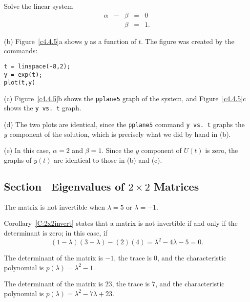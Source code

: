 \soln Solve the linear system
\[
\begin{array}{rrrrl}
\alpha & - & \beta & = & 0 \\
& & \beta & = & 1. \end{array}
\]

(b) Figure~\ref{c4.4.5}a shows $y$ as a function of $t$.  The figure
was created by the \Matlab commands:
\begin{verbatim}
t = linspace(-8,2);
y = exp(t);
plot(t,y)
\end{verbatim}

(c) Figure~\ref{c4.4.5}b shows the {\tt pplane5} graph of the system,
and Figure~\ref{c4.4.5}c shows the {\tt y vs.\ t} graph.

(d) The two plots are identical, since the {\tt pplane5} command
{\tt y vs.\ t} graphs the $y$ component of the solution, which is
precisely what we did by hand in (b).

(e) In this case, $\alpha = 2$ and $\beta = 1$.  Since the $y$
component of $U(t)$ is zero, the graphs of $y(t)$ are identical
to those in (b) and (c).

\begin{figure}[htb]
                       \centerline{%
                       }
\end{figure}





\subsection*{Section~\protect{\ref{S:evchp}} Eigenvalues of $2\times 2$ Matrices}

\ans The matrix is not invertible when $\lambda = 5$ or $\lambda = -1$.

\soln Corollary~\ref{C:2x2invert} states that a matrix is not invertible
if and only if the determinant is zero; in this case, if
\[
(1 - \lambda)(3 - \lambda) - (2)(4) = \lambda^2 - 4\lambda - 5 = 0.
\]


\newpage
{} The determinant of the matrix is $-1$, the trace is $0$, and
the characteristic polynomial is $p(\lambda)=\lambda^2-1$.

 The determinant of the matrix is $23$, the trace is $7$, and
the characteristic polynomial is $p(\lambda)=\lambda^2-7\lambda+23$.

